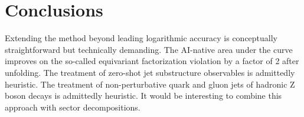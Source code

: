 \section{Conclusions}\label{sec:conclusions}

Extending the method beyond leading logarithmic accuracy is conceptually
straightforward but technically demanding. The AI-native area under the
curve improves on the so-called equivariant factorization violation by a
factor of 2 after unfolding. The treatment of zero-shot jet substructure
observables is admittedly heuristic. The treatment of non-perturbative
quark and gluon jets of hadronic Z boson decays is admittedly heuristic.
It would be interesting to combine this approach with sector
decompositions.

